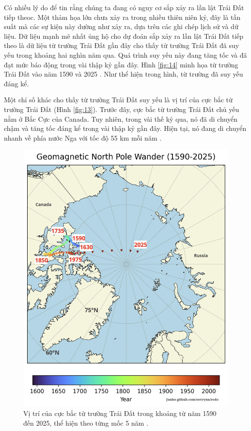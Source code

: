 \documentclass[10pt,twocolumn,letterpaper]{article}
\begin{document}
Có nhiều lý do để tin rằng chúng ta đang có nguy cơ sắp xảy ra lần lật Trái Đất tiếp theoc. Một thảm họa lớn chưa xảy ra trong nhiều thiên niên kỷ, đây là tần suất mà các sự kiện này dường như xảy ra, dựa trên các ghi chép lịch sử và dữ liệu. Dữ liệu mạnh mẽ nhất ủng hộ cho dự đoán sắp xảy ra lần lật Trái Đất tiếp theo là dữ liệu từ trường Trái Đất gần đây cho thấy từ trường Trái Đất đã suy yếu trong khoảng hai nghìn năm qua. Quá trình suy yếu này đang tăng tốc và đã đạt mức báo động trong vài thập kỷ gần đây.
Hình \ref{fig:14} minh họa từ trường Trái Đất vào năm 1590 và 2025 \cite{125,126}. Như thể hiện trong hình, từ trường đã suy yếu đáng kể.

Một chỉ số khác cho thấy từ trường Trái Đất suy yếu là vị trí của cực bắc từ trường Trái Đất (Hình \ref{fig:13}). Trước đây, cực bắc từ trường Trái Đất chủ yếu nằm ở Bắc Cực của Canada. Tuy nhiên, trong vài thế kỷ qua, nó đã di chuyển chậm và tăng tốc đáng kể trong vài thập kỷ gần đây. Hiện tại, nó đang di chuyển nhanh về phía nước Nga với tốc độ 55 km mỗi năm \cite{124}.

\begin{figure}[t]
\begin{center}
   \includegraphics[width=1\linewidth]{npw.jpg}
\end{center}
   \caption{Vị trí của cực bắc từ trường Trái Đất trong khoảng từ năm 1590 đến 2025, thể hiện theo từng mốc 5 năm \cite{142}.}
\label{fig:13}
\label{fig:onecol}
\end{figure}
\end{document}
